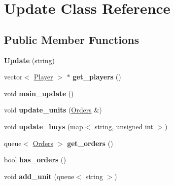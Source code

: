 \hypertarget{class_update}{\section{Update Class Reference}
\label{class_update}
}
\subsection*{Public Member Functions}
\begin{DoxyCompactItemize}
\item 
\hypertarget{class_update_a28dd7deebaa2863e30291986e70061bb}{{\bfseries Update} (string)}\label{class_update_a28dd7deebaa2863e30291986e70061bb}

\item 
\hypertarget{class_update_a8bb780249712a2b0fdcfa1450a65be75}{vector$<$ \hyperlink{class_player}{Player} $>$ $\ast$ {\bfseries get\-\_\-players} ()}\label{class_update_a8bb780249712a2b0fdcfa1450a65be75}

\item 
\hypertarget{class_update_abaebc1704b7c2b3abbba1ca5f20b58b5}{void {\bfseries main\-\_\-update} ()}\label{class_update_abaebc1704b7c2b3abbba1ca5f20b58b5}

\item 
\hypertarget{class_update_a20f41e11b35a3ff407ffadf8d33a5465}{void {\bfseries update\-\_\-units} (\hyperlink{class_orders}{Orders} \&)}\label{class_update_a20f41e11b35a3ff407ffadf8d33a5465}

\item 
\hypertarget{class_update_a68cffdaf2707f7c02e64c71d62b479a1}{void {\bfseries update\-\_\-buys} (map$<$ string, unsigned int $>$)}\label{class_update_a68cffdaf2707f7c02e64c71d62b479a1}

\item 
\hypertarget{class_update_a0ae8c95d836686436e19e15f7be3e043}{queue$<$ \hyperlink{class_orders}{Orders} $>$ {\bfseries get\-\_\-orders} ()}\label{class_update_a0ae8c95d836686436e19e15f7be3e043}

\item 
\hypertarget{class_update_a430086cc0eb5ac98b38776b576cff239}{bool {\bfseries has\-\_\-orders} ()}\label{class_update_a430086cc0eb5ac98b38776b576cff239}

\item 
\hypertarget{class_update_afa1e25b78b8a227b09235d894e0e2d33}{void {\bfseries add\-\_\-unit} (queue$<$ string $>$)}\label{class_update_afa1e25b78b8a227b09235d894e0e2d33}

\end{DoxyCompactItemize}
